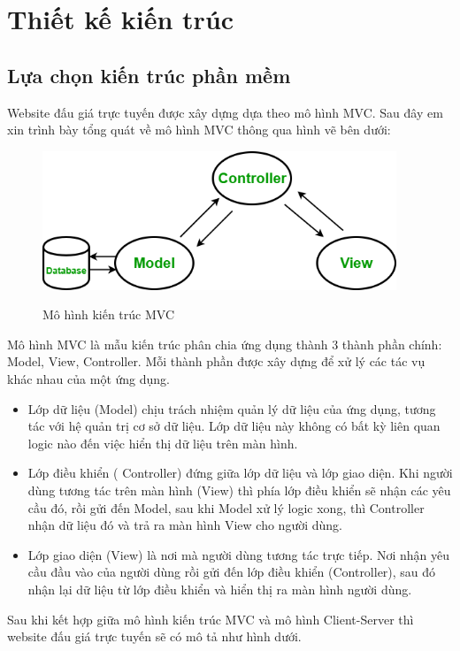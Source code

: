 \documentclass[../DoAn.tex]{subfiles}
\begin{document}
\section{Thiết kế kiến trúc}
\subsection{Lựa chọn kiến trúc phần mềm}
Website đấu giá trực tuyến được xây dựng dựa theo mô hình MVC. Sau đây em xin trình bày tổng quát về mô hình MVC thông qua hình vẽ bên dưới: 
\begin{figure}[H]
    \centering
    \includegraphics[width=10.6cm,height=4.15cm]{Hinhve/mvc.png}\cite{MVC}
    \caption{Mô hình kiến trúc MVC}
    \label{fig:Fig41}
\end{figure}
Mô hình MVC là mẫu kiến trúc phân chia ứng dụng thành 3 thành phần chính: Model, View, Controller. Mỗi thành phần được xây dựng để xử lý các tác vụ khác nhau của một ứng dụng\cite{MVC2}.
\begin{itemize}
    \item Lớp dữ liệu (Model) chịu trách nhiệm quản lý dữ liệu của ứng dụng, tương tác với hệ quản trị cơ sở dữ liệu. Lớp dữ liệu này không có bất kỳ liên quan logic nào đến việc hiển thị dữ liệu trên màn hình.
    \item Lớp điều khiển ( Controller) đứng giữa lớp dữ liệu và lớp giao diện. Khi người dùng tương tác trên màn hình (View) thì phía lớp điều khiển sẽ nhận các yêu cầu đó, rồi gửi đến Model, sau khi Model xử lý logic xong, thì Controller nhận dữ liệu đó và trả ra màn hình View cho người dùng.
    \item Lớp giao diện (View) là nơi mà người dùng tương tác trực tiếp. Nơi nhận yêu cầu đầu vào của người dùng rồi gửi đến lớp điều khiển (Controller), sau đó nhận lại dữ liệu từ lớp điều khiển và hiển thị ra màn hình người dùng.
\end{itemize}
\newpage
Sau khi kết hợp giữa mô hình kiến trúc MVC và mô hình Client-Server thì website đấu giá trực tuyến sẽ có mô tả như hình dưới. 
\end{document}
